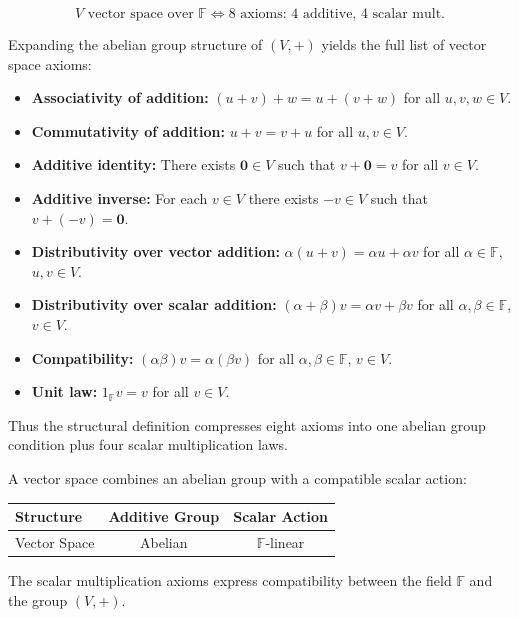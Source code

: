 \begin{remark*}
\[ V\text{ vector space over }\mathbb{F} \iff \text{8 axioms: 4 additive, 4 scalar mult}. \]
\end{remark*}

\begin{remark*}[Flash]
\end{remark*}

\begin{remark*}
Expanding the abelian group structure of $(V,+)$ yields the full list of vector space axioms:

\begin{itemize}
\item \textbf{Associativity of addition:}
      $(u + v) + w = u + (v + w)$ for all $u,v,w \in V$.
\item \textbf{Commutativity of addition:}
      $u + v = v + u$ for all $u,v \in V$.
\item \textbf{Additive identity:}
      There exists $\mathbf{0} \in V$ such that $v + \mathbf{0} = v$ for all $v \in V$.
\item \textbf{Additive inverse:}
      For each $v \in V$ there exists $-v \in V$ such that $v + (-v) = \mathbf{0}$.
\item \textbf{Distributivity over vector addition:}
      $\alpha(u + v) = \alpha u + \alpha v$
      for all $\alpha \in \mathbb{F}$, $u,v \in V$.
\item \textbf{Distributivity over scalar addition:}
      $(\alpha + \beta)v = \alpha v + \beta v$
      for all $\alpha,\beta \in \mathbb{F}$, $v \in V$.
\item \textbf{Compatibility:}
      $(\alpha\beta)v = \alpha(\beta v)$
      for all $\alpha,\beta \in \mathbb{F}$, $v \in V$.
\item \textbf{Unit law:} $1_{\mathbb{F}} v = v$ for all $v \in V$.
\end{itemize}

Thus the structural definition compresses eight axioms into one abelian group condition
plus four scalar multiplication laws.
\end{remark*}

\begin{remark*}
A vector space combines an abelian group with a compatible scalar action:

\begin{center}
\begin{tabular}{l|c|c}
Structure & Additive Group & Scalar Action \\
\hline
Vector Space & Abelian & $\mathbb{F}$-linear
\end{tabular}
\end{center}

The scalar multiplication axioms express compatibility between the field $\mathbb{F}$
and the group $(V,+)$.
\end{remark*}

